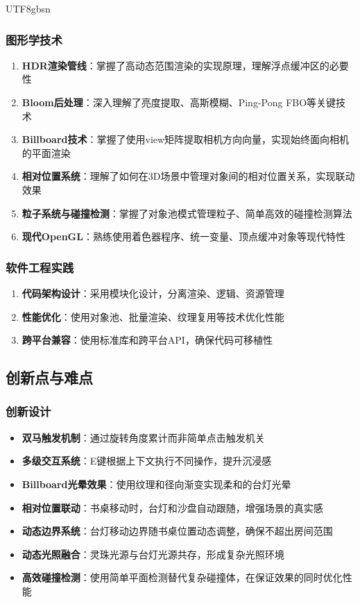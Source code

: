 \documentclass{article}
\begin{document}
\begin{CJK}{UTF8}{gbsn}
\subsubsection{图形学技术}
\begin{enumerate}
    \item \textbf{HDR渲染管线}：掌握了高动态范围渲染的实现原理，理解浮点缓冲区的必要性
    \item \textbf{Bloom后处理}：深入理解了亮度提取、高斯模糊、Ping-Pong FBO等关键技术
    \item \textbf{Billboard技术}：掌握了使用view矩阵提取相机方向向量，实现始终面向相机的平面渲染
    \item \textbf{相对位置系统}：理解了如何在3D场景中管理对象间的相对位置关系，实现联动效果
    \item \textbf{粒子系统与碰撞检测}：掌握了对象池模式管理粒子、简单高效的碰撞检测算法
    \item \textbf{现代OpenGL}：熟练使用着色器程序、统一变量、顶点缓冲对象等现代特性
\end{enumerate}

\subsubsection{软件工程实践}
\begin{enumerate}
    \item \textbf{代码架构设计}：采用模块化设计，分离渲染、逻辑、资源管理
    \item \textbf{性能优化}：使用对象池、批量渲染、纹理复用等技术优化性能
    \item \textbf{跨平台兼容}：使用标准库和跨平台API，确保代码可移植性
\end{enumerate}

\subsection{创新点与难点}

\subsubsection{创新设计}
\begin{itemize}
    \item \textbf{双马触发机制}：通过旋转角度累计而非简单点击触发机关
    \item \textbf{多级交互系统}：E键根据上下文执行不同操作，提升沉浸感
    \item \textbf{Billboard光晕效果}：使用纹理和径向渐变实现柔和的台灯光晕
    \item \textbf{相对位置联动}：书桌移动时，台灯和沙盘自动跟随，增强场景的真实感
    \item \textbf{动态边界系统}：台灯移动边界随书桌位置动态调整，确保不超出房间范围
    \item \textbf{动态光照融合}：灵珠光源与台灯光源共存，形成复杂光照环境
    \item \textbf{高效碰撞检测}：使用简单平面检测替代复杂碰撞体，在保证效果的同时优化性能
\end{itemize}


\end{CJK}
\end{document}
